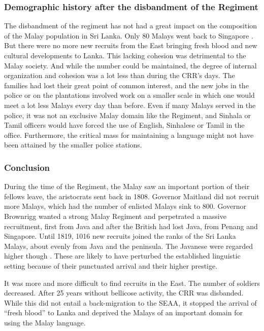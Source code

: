 \subsubsection{Demographic history after the disbandment of the Regiment}\label{sec:slmbg:DemographichistoryafterthedisbandmentoftheRegiment}
The disbandment of the regiment has not had a great impact on the composition of the Malay population in Sri Lanka. Only 80 Malays went back to Singapore \citep[104]{Hussainmiya1990}. But there were no more new recruits from the East bringing fresh blood and new cultural developments to Lanka. This lacking cohesion was detrimental to the Malay society. And while the number could be maintained, the degree of internal organization and cohesion was a lot less than during the CRR's days. The families had lost their great point of common interest, and the new jobs in the police or on the plantations involved work on a smaller scale in which one would meet a lot less Malays every day than before.
Even if many Malays served in the police, it was not an exclusive Malay domain like the Regiment, and Sinhala or Tamil officers would have forced the use of English, Sinhalese or Tamil in the office. Furthermore, the critical mass for maintaining a language might not have been attained by the smaller police stations.


\subsubsection{Conclusion}\label{sec:slmbg:british:demographic:conclusion:Conclusion}
During the time of the Regiment, the Malay saw an important
portion of their fellows leave, the aristocrats sent back in 1808.
Governor Maitland did not recruit more Malays, which had the
number of enlisted Malays sink to 800. Governor Brownrigg wanted a
strong Malay Regiment and perpetrated a massive recruitment, first
from Java and after the British had lost Java, from Penang and
Singapore. Until 1819, 1016 new recruits joined the ranks of the
Sri Lanka Malays, about evenly from Java and the peninsula. The
Javanese were regarded higher though \citep[93f]{Hussainmiya1990}. These are likely to have
perturbed the established linguistic setting because of their
punctuated arrival and their higher prestige.

It was more and more difficult to find recruits in the East. The
number of soldiers decreased. After 25 years without bellicose
activity, the CRR was disbanded. While this did not entail a
back-migration to the SEAA, it stopped the arrival of ``fresh
blood'' to Lanka and deprived the Malays of an important domain
for using the Malay language.

